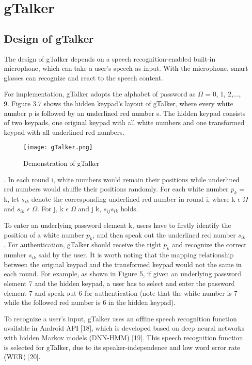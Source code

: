 \documentclass[12pt,a4paper,oneside]{report}
\begin{document}
\section{gTalker}
\subsection{Design of gTalker}
The design of gTalker depends on a speech
recognition-enabled built-in microphone, which can take
a user’s speech as input. With the microphone, smart glasses
can recognize and react to the speech content. \par
For implementation, gTalker adopts the alphabet of password as $\Omega$ = {0, 1, 2,..., 9}. Figure 3.7 shows the hidden
keypad’s layout of gTalker, where every white number p is
followed by an underlined red number s. The hidden keypad
consists of two keypads, one original keypad with all white
numbers and one transformed keypad with all underlined red numbers.
\begin{figure}[H]
    \begin{center}
        \label{abc}
            \texttt{[image: gTalker.png]}
            \caption{Demonstration of gTalker}
    \end{center}
\end{figure}
. In each round i, white numbers would remain their
positions while underlined red numbers would shuffle their
positions randomly. For each white number $p_k$ = k, let $s_{ik}$
denote the corresponding underlined red number in round i,
where k $\epsilon$ $\Omega$  and $s_{ik}$ $\epsilon$ $\Omega$. For 	\forall j, k $\epsilon$ $\Omega$  and j \neq k, \hspace{2}   $s_{ij}$\neq$s_{ik}$ 
holds.
\par To enter an underlying password element k, users have to
firstly identify the position of a white number $p_k$, and then
speak out the underlined red number $s_{ik}$ . For authentication,
gTalker should receive the right $p_k$ and recognize the correct
number  $s_{ik}$ said by the user. It is worth noting that the mapping
relationship between the original keypad and the transformed
keypad would not the same in each round. For example,
as shown in Figure 5, if given an underlying password element
7 and the hidden keypad, a user has to select and enter the
password element 7 and speak out 6 for authentication (note
that the white number is 7 while the followed red number is
6 in the hidden keypad).

\par To recognize a user’s input, gTalker uses an offline speech
recognition function available in Android API [18], which is
developed based on deep neural networks with hidden Markov
models (DNN-HMM) [19]. This speech recognition function is selected for gTalker, due to its speaker-independence
and low word error rate (WER) [20].
\end{document}
